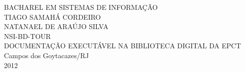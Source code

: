\begin{titlepage}
 \begin{figure}[ht]
 \centering
 \end{figure}
 \begin{center}
   {\large BACHAREL EM SISTEMAS DE INFORMAÇÃO} \\ [3.5cm]
   {\large TIAGO SAMAHÁ CORDEIRO} \\
   {\large NATANAEL DE ARAÚJO SILVA} \\ [4cm]
   {\large NSI-BD-TOUR} \\ [0.5cm]
   {\small DOCUMENTAÇÃO EXECUTÁVEL NA BIBLIOTECA DIGITAL DA EPCT} \\
   \vfill
   {\large Campos dos Goytacazes/RJ} \\
   {\large 2012}
 \end{center}
\end{titlepage}